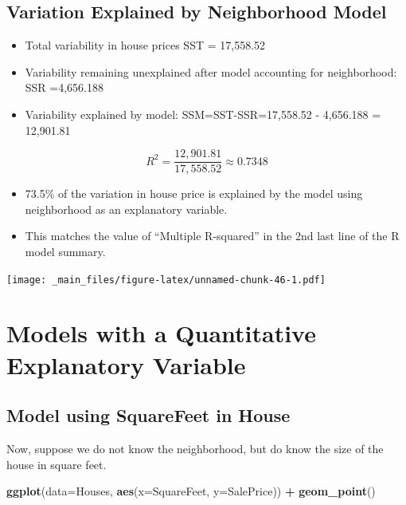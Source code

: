 \documentclass[]{book}
\newenvironment{Shaded}{\begin{snugshade}}{\end{snugshade}}
\newcommand{\KeywordTok}[1]{\textcolor[rgb]{0.13,0.29,0.53}{\textbf{#1}}}
\newcommand{\DataTypeTok}[1]{\textcolor[rgb]{0.13,0.29,0.53}{#1}}
\newcommand{\StringTok}[1]{\textcolor[rgb]{0.31,0.60,0.02}{#1}}
\newcommand{\OperatorTok}[1]{\textcolor[rgb]{0.81,0.36,0.00}{\textbf{#1}}}
\newcommand{\NormalTok}[1]{#1}
\providecommand{\tightlist}{%
  \setlength{\itemsep}{0pt}\setlength{\parskip}{0pt}}
\begin{document}
\subsection{Variation Explained by Neighborhood
Model}\label{variation-explained-by-neighborhood-model}

\begin{itemize}
\tightlist
\item
  Total variability in house prices SST = 17,558.52\\
\item
  Variability remaining unexplained after model accounting for
  neighborhood: SSR =4,656.188\\
\item
  Variability explained by model: SSM=SST-SSR=17,558.52 - 4,656.188 =
  12,901.81
\end{itemize}

\[ R^2= \frac{12,901.81}{17,558.52}\approx0.7348 \]

\begin{itemize}
\item
  73.5\% of the variation in house price is explained by the model using
  neighborhood as an explanatory variable.
\item
  This matches the value of ``Multiple R-squared'' in the 2nd last line
  of the R model summary.
\end{itemize}

\texttt{[image: \_main\_files/figure-latex/unnamed-chunk-46-1.pdf]}

\section{Models with a Quantitative Explanatory
Variable}\label{models-with-a-quantitative-explanatory-variable}

\subsection{Model using SquareFeet in
House}\label{model-using-squarefeet-in-house}

Now, suppose we do not know the neighborhood, but do know the size of
the house in square feet.

\begin{Shaded}
\begin{Highlighting}[]
\KeywordTok{ggplot}\NormalTok{(}\DataTypeTok{data=}\NormalTok{Houses, }\KeywordTok{aes}\NormalTok{(}\DataTypeTok{x=}\NormalTok{SquareFeet, }\DataTypeTok{y=}\NormalTok{SalePrice)) }\OperatorTok{+}\StringTok{ }\KeywordTok{geom_point}\NormalTok{() }
\end{Highlighting}
\end{Shaded}
\end{document}
